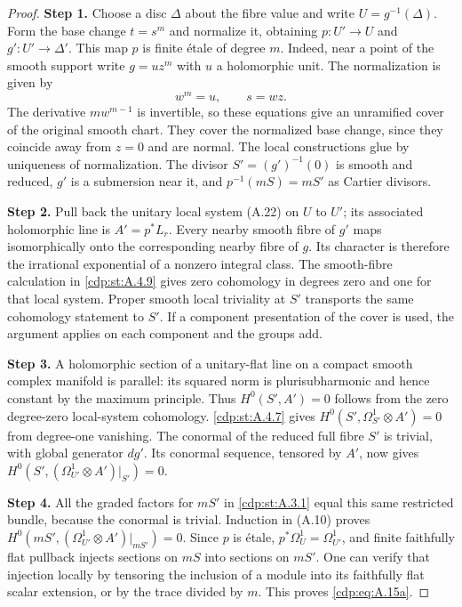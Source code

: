 \begin{proof}
\noindent\textbf{Step 1.} Choose a disc $\Delta$ about the fibre value and write $U=g^{-1}(\Delta)$. Form the base change $t=s^m$ and normalize it, obtaining $p:U'\to U$ and $g':U'\to\Delta'$. This map $p$ is finite étale of degree $m$. Indeed, near a point of the smooth support write $g=u z^m$ with $u$ a holomorphic unit. The normalization is given by
\[
 w^m=u,\qquad s=wz.
\]
The derivative $m w^{m-1}$ is invertible, so these equations give an unramified cover of the original smooth chart. They cover the normalized base change, since they coincide away from $z=0$ and are normal. The local constructions glue by uniqueness of normalization. The divisor $S'=(g')^{-1}(0)$ is smooth and reduced, $g'$ is a submersion near it, and $p^{-1}(mS)=mS'$ as Cartier divisors.

\noindent\textbf{Step 2.} Pull back the unitary local system (A.22) on $U$ to $U'$; its associated holomorphic line is $A'=p^*L_r$. Every nearby smooth fibre of $g'$ maps isomorphically onto the corresponding nearby fibre of $g$. Its character is therefore the irrational exponential of a nonzero integral class. The smooth-fibre calculation in \ref{cdp:st:A.4.9} gives zero cohomology in degrees zero and one for that local system. Proper smooth local triviality at $S'$ transports the same cohomology statement to $S'$. If a component presentation of the cover is used, the argument applies on each component and the groups add.

\noindent\textbf{Step 3.} A holomorphic section of a unitary-flat line on a compact smooth complex manifold is parallel: its squared norm is plurisubharmonic and hence constant by the maximum principle. Thus $H^0(S',A')=0$ follows from the zero degree-zero local-system cohomology. \ref{cdp:st:A.4.7} gives $H^0(S',\Omega_{S'}^1\otimes A')=0$ from degree-one vanishing. The conormal of the reduced full fibre $S'$ is trivial, with global generator $dg'$. Its conormal sequence, tensored by $A'$, now gives
$H^0(S',(\Omega_{U'}^1\otimes A')|_{S'})=0$.

\noindent\textbf{Step 4.} All the graded factors for $mS'$ in \ref{cdp:st:A.3.1} equal this same restricted bundle, because the conormal is trivial. Induction in (A.10) proves $H^0(mS',(\Omega_{U'}^1\otimes A')|_{mS'})=0$. Since $p$ is étale, $p^*\Omega_U^1=\Omega_{U'}^1$, and finite faithfully flat pullback injects sections on $mS$ into sections on $mS'$. One can verify that injection locally by tensoring the inclusion of a module into its faithfully flat scalar extension, or by the trace divided by $m$. This proves \eqref{cdp:eq:A.15a}.


\end{proof}
